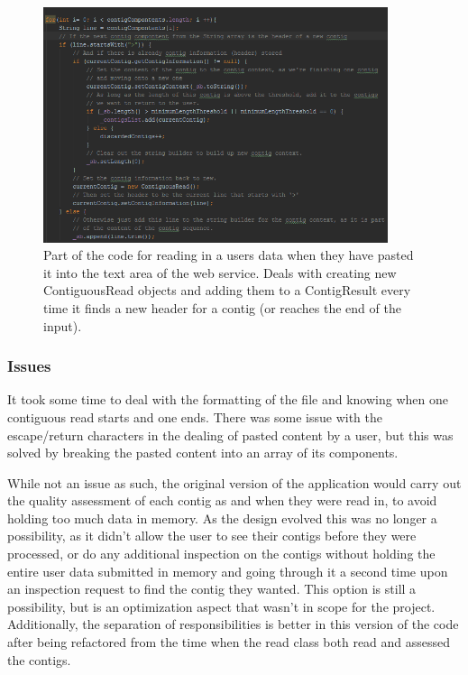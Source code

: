 \begin{figure}[H]
\centering
\includegraphics[width=0.9\textwidth]{images/readuserdata}
\caption{Part of the code for reading in a users data when they have pasted it into the text area of the web service. Deals with creating new ContiguousRead objects and adding them to a ContigResult every time it finds a new header for a contig (or reaches the end of the input).}
\end{figure}

\subsubsection{Issues}
It took some time to deal with the formatting of the file and knowing when one contiguous read starts and one ends. There was some issue with the escape/return characters in the dealing of pasted content by a user, but this was solved by breaking the pasted content into an array of its components.

While not an issue as such, the original version of the application would carry out the quality assessment of each contig as and when they were read in, to avoid holding too much data in memory. As the design evolved this was no longer a possibility, as it didn't allow the user to see their contigs before they were processed, or do any additional inspection on the contigs without holding the entire user data submitted in memory and going through it a second time upon an inspection request to find the contig they wanted. This option is still a possibility, but is an optimization aspect that wasn't in scope for the project. Additionally, the separation of responsibilities is better in this version of the code after being refactored from the time when the read class both read and assessed the contigs.


